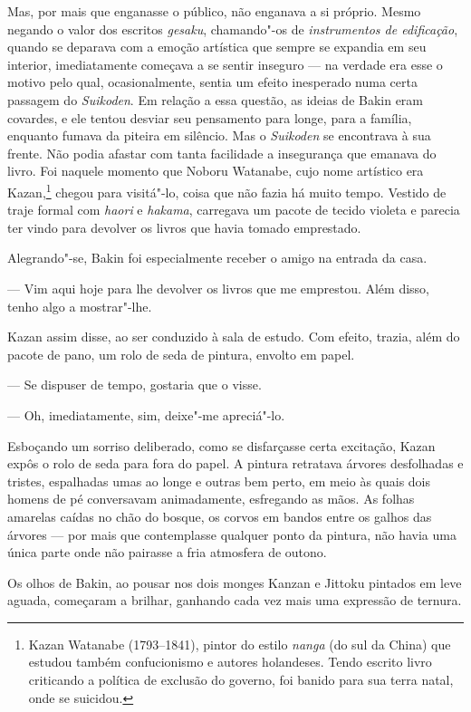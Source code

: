 Mas, por mais que enganasse o público, não enganava a si próprio. Mesmo
negando o valor dos escritos \textit{gesaku}, chamando"-os de
\textit{instrumentos de edificação}, quando se deparava com a emoção artística
que sempre se expandia em seu interior, imediatamente começava a se
sentir inseguro --- na verdade era esse o motivo pelo qual,
ocasionalmente, sentia um efeito inesperado numa certa passagem do
\textit{Suikoden}. Em relação a essa questão, as ideias de Bakin eram
covardes, e ele tentou desviar seu pensamento para longe, para a
família, enquanto fumava da piteira em silêncio. Mas o
\textit{Suikoden} se encontrava à sua frente. Não podia afastar com
tanta facilidade a insegurança que emanava do livro. Foi naquele
momento que Noboru Watanabe, cujo nome artístico era Kazan,\footnote{ Kazan Watanabe 
(1793--1841), pintor do estilo \textit{nanga} (do sul da
China) que estudou também confucionismo e autores holandeses. Tendo
escrito livro criticando a política de exclusão do governo, foi banido
para sua terra natal, onde se suicidou.} chegou para visitá"-lo, coisa
que não fazia há muito tempo. Vestido de traje formal com
\textit{haori} e \textit{hakama}, carregava um pacote de tecido violeta
e parecia ter vindo para devolver os livros que havia tomado emprestado.

Alegrando"-se, Bakin foi especialmente receber o amigo na entrada da casa.

--- Vim aqui hoje para lhe devolver os livros que me emprestou. Além
disso, tenho algo a mostrar"-lhe.

Kazan assim disse, ao ser conduzido à sala de estudo. Com efeito,
trazia, além do pacote de pano, um rolo de seda de pintura, envolto em
papel.

--- Se dispuser de tempo, gostaria que o visse.

--- Oh, imediatamente, sim, deixe"-me apreciá"-lo.

Esboçando um sorriso deliberado, como se disfarçasse certa excitação,
Kazan expôs o rolo de seda para fora do papel. A pintura retratava
árvores desfolhadas e tristes, espalhadas umas ao longe e outras bem
perto, em meio às quais dois homens de pé conversavam animadamente,
esfregando as mãos. As folhas amarelas caídas no chão do bosque, os
corvos em bandos entre os galhos das árvores --- por mais que
contemplasse qualquer ponto da pintura, não havia uma única parte onde
não pairasse a fria atmosfera de outono.

Os olhos de Bakin, ao pousar nos dois monges Kanzan e Jittoku pintados
em leve aguada, começaram a brilhar, ganhando cada vez mais uma
expressão de ternura.

